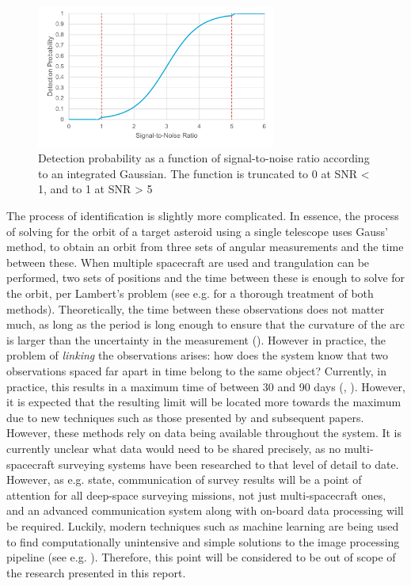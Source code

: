 \begin{figure}[htbp]
 \centering
 \includegraphics[width=0.7\textwidth]{img/snr_graph.pdf}
 \caption{Detection probability as a function of signal-to-noise ratio according to an integrated Gaussian. The function is truncated to 0 at SNR < 1, and to 1 at SNR > 5}
 \label{fig:snrgraph}
\end{figure}

The process of identification is slightly more complicated. In essence, the process of solving for the orbit of a target asteroid using a single telescope uses Gauss' method, to obtain an orbit from three sets of angular measurements and the time between these. When multiple spacecraft are used and trangulation can be performed, two sets of positions and the time between these is enough to solve for the orbit, per Lambert's problem (see e.g. \cite{Curtis} for a thorough treatment of both methods). Theoretically, the time between these observations does not matter much, as long as the period is long enough to ensure that the curvature of the arc is larger than the uncertainty in the measurement (\cite{OpNav}). However in practice, the problem of \textit{linking} the observations arises: how does the system know that two observations spaced far apart in time belong to the same object? Currently, in practice, this results in a maximum time of between 30 and 90 days (\cite{DetectionAndTracking}, \cite{2017NEOSDT}). However, it is expected that the resulting limit will be located more towards the maximum due to new techniques such as those presented by \cite{ShortArcs} and subsequent papers.\\

However, these methods rely on data being available throughout the system. It is currently unclear what data would need to be shared precisely, as no multi-spacecraft surveying systems have been researched to that level of detail to date. However, as e.g. \cite{2017NEOSDT} state, communication of survey results will be a point of attention for all deep-space surveying missions, not just multi-spacecraft ones, and an advanced communication system along with on-board data processing will be required. Luckily, modern techniques such as machine learning are being used to find computationally unintensive and simple solutions to the image processing pipeline (see e.g. \cite{AIImage}). Therefore, this point will be considered to be out of scope of the research presented in this report. \\

